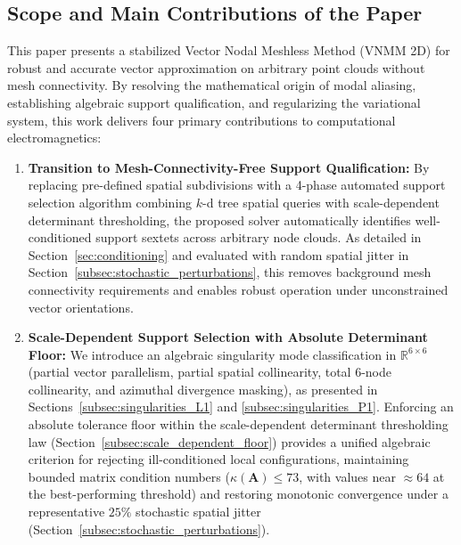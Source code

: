 \documentclass[preprint,12pt]{elsarticle}
\begin{document}
\subsection{Scope and Main Contributions of the Paper}
\label{subsec:scope_contributions}
This paper presents a stabilized Vector Nodal Meshless Method (VNMM 2D) for robust and accurate vector approximation on arbitrary point clouds without mesh connectivity. By resolving the mathematical origin of modal aliasing, establishing algebraic support qualification, and regularizing the variational system, this work delivers four primary contributions to computational electromagnetics:

\begin{enumerate}
    \item \textbf{Transition to Mesh-Connectivity-Free Support Qualification:} By replacing pre-defined spatial subdivisions with a 4-phase automated support selection algorithm combining $k$-d tree spatial queries with scale-dependent determinant thresholding, the proposed solver automatically identifies well-conditioned support sextets across arbitrary node clouds. As detailed in Section~\ref{sec:conditioning} and evaluated with random spatial jitter in Section~\ref{subsec:stochastic_perturbations}, this removes background mesh connectivity requirements and enables robust operation under unconstrained vector orientations.
    
    \item \textbf{Scale-Dependent Support Selection with Absolute Determinant Floor:} We introduce an algebraic singularity mode classification in $\mathbb{R}^{6\times6}$ (partial vector parallelism, partial spatial collinearity, total 6-node collinearity, and azimuthal divergence masking), as presented in Sections~\ref{subsec:singularities_L1} and \ref{subsec:singularities_P1}. Enforcing an absolute tolerance floor within the scale-dependent determinant thresholding law (Section~\ref{subsec:scale_dependent_floor}) provides a unified algebraic criterion for rejecting ill-conditioned local configurations, maintaining bounded matrix condition numbers ($\kappa(\mathbf{A}) \le 73$, with values near $\approx 64$ at the best-performing threshold) and restoring monotonic convergence under a representative $25\%$ stochastic spatial jitter (Section~\ref{subsec:stochastic_perturbations}).
    

\end{enumerate}
\end{document}
